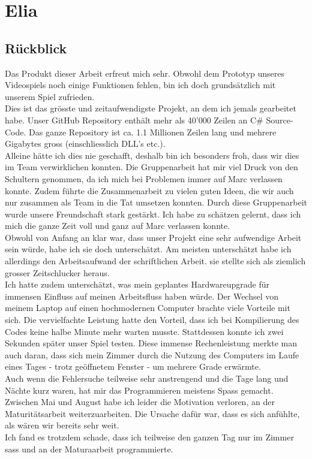 \chapter{Elia}

\section{Rückblick}
Das Produkt dieser Arbeit erfreut mich sehr. Obwohl dem Prototyp unseres Videospiels noch einige Funktionen fehlen, bin ich doch grundsätzlich mit unserem Spiel zufrieden. \\
Dies ist das grösste und zeitaufwendigste Projekt, an dem ich jemals gearbeitet habe. Unser GitHub Repository enthält mehr als 40'000 Zeilen an C\# Source-Code.
Das ganze Repository ist ca. 1.1 Millionen Zeilen lang und mehrere Gigabytes gross (einschliesslich DLL's etc.). \\
Alleine hätte ich dies nie geschafft, deshalb bin ich besonders froh, dass wir dies im Team verwirklichen konnten. Die Gruppenarbeit hat mir viel Druck von den Schultern genommen, da ich mich bei Problemen immer auf Marc
verlassen konnte. Zudem führte die Zusammenarbeit zu vielen guten Ideen, die wir auch nur zusammen als Team in die Tat umsetzen konnten. Durch diese Gruppenarbeit wurde unsere Freundschaft stark gestärkt.
Ich habe zu schätzen gelernt, dass ich mich die ganze Zeit voll und ganz auf Marc verlassen konnte.\\
Obwohl von Anfang an klar war, dass unser Projekt eine sehr aufwendige Arbeit sein würde, habe ich sie doch unterschätzt. Am meisten unterschätzt habe ich allerdings den Arbeitsaufwand der schriftlichen Arbeit. sie stellte sich als ziemlich grosser Zeitschlucker heraus. \\
Ich hatte zudem unterschätzt, was mein geplantes Hardwareupgrade für immensen Einfluss auf meinen Arbeitsfluss haben würde. Der Wechsel von meinem Laptop auf einen hochmodernen Computer brachte viele Vorteile mit sich.
Die vervielfachte Leistung hatte den Vorteil, dass ich bei Kompilierung des Codes keine halbe Minute mehr warten musste. Stattdessen konnte ich zwei Sekunden später unser Spiel testen.
Diese immense Rechenleistung merkte man auch daran, dass sich mein Zimmer durch die Nutzung des Computers im Laufe eines Tages - trotz geöffnetem Fenster - um mehrere Grade erwärmte.\\
Auch wenn die Fehlersuche teilweise sehr anstrengend und die Tage lang und Nächte kurz waren, hat mir das Programmieren meistens Spass gemacht. Zwischen Mai und August habe ich leider die Motivation verloren, an
der Maturitätsarbeit weiterzuarbeiten. Die Ursache dafür war, dass es sich anfühlte, als wären wir bereits sehr weit.
\\
Ich fand es trotzdem schade,
dass ich teilweise den ganzen Tag nur im Zimmer sass und an der Maturaarbeit programmierte. 

